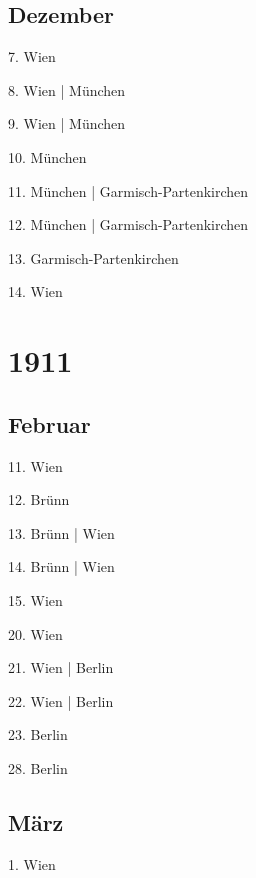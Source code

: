 \documentclass[twoside=false,titlepage=false,open=any, parskip=never, fontsize=10pt, headings=small, chapterprefix=false, appendixprefix=false, DIV=15]{scrbook}
\begin{document}
\begin{multicols}{3}
            \section*{Dezember}
            7. Wien\par
            8. Wien | München\par
            9. Wien | München\par
            10. München\par
            11. München | Garmisch-Partenkirchen\par
            12. München | Garmisch-Partenkirchen\par
            13. Garmisch-Partenkirchen\par
            14. Wien\par
            \chapter*{1911}
            \section*{Februar}
            11. Wien\par
            12. Brünn\par
            13. Brünn | Wien\par
            14. Brünn | Wien\par
            15. Wien\par
            20. Wien\par
            21. Wien | Berlin\par
            22. Wien | Berlin\par
            23. Berlin\par
            28. Berlin\par
            \section*{März}
            1. Wien\par

\end{multicols}
\end{document}

